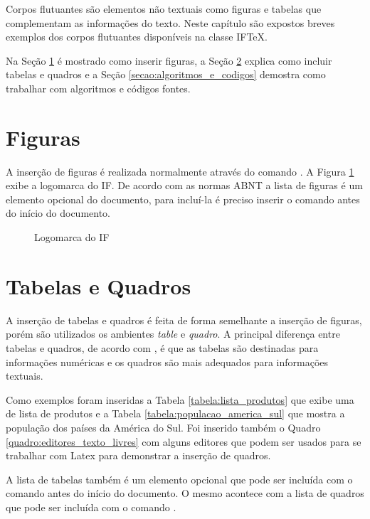 Corpos flutuantes são elementos não textuais como figuras e tabelas que complementam as informações do texto. Neste capítulo são expostos breves exemplos dos corpos flutuantes disponíveis na classe {IF\TeX}.

Na Seção \ref{secao:figuras} é mostrado como inserir figuras, a Seção \ref{secao:tabelas_e_quadros} explica como incluir tabelas e quadros e a Seção \ref{secao:algoritmos_e_codigos} demostra como trabalhar com algoritmos e códigos fontes.

\section{Figuras}
\label{secao:figuras}

A inserção de figuras é realizada normalmente através do comando . A Figura \ref{figura:logomarca_if} exibe a logomarca do IF. De acordo com as normas ABNT a lista de figuras é um elemento opcional do documento, para incluí-la é preciso inserir o comando  antes do início do documento.

\begin{figure}[htb]  \centering
 \iflogo
 \caption{Logomarca do IF} \label{figura:logomarca_if}
\end{figure}

\section{Tabelas e Quadros}
\label{secao:tabelas_e_quadros}

A inserção de tabelas e quadros é feita de forma semelhante a inserção de figuras, porém são utilizados os ambientes \textit{table} e \textit{quadro}. A principal diferença entre tabelas e quadros, de acordo com \citet{castro:2016:manual}, é que as tabelas são destinadas para informações numéricas e os quadros são mais adequados para informações textuais.

Como exemplos foram inseridas a Tabela \ref{tabela:lista_produtos} que exibe uma de lista de produtos e a Tabela \ref{tabela:populacao_america_sul} que mostra a população dos países da América do Sul. Foi inserido também o Quadro \ref{quadro:editores_texto_livres} com alguns editores que podem ser usados para se trabalhar com Latex para demonstrar a inserção de quadros.

 A lista de tabelas também é um elemento opcional que pode ser incluída com o comando  antes do início do documento. O mesmo acontece com a lista de quadros que pode ser incluída com o comando .


